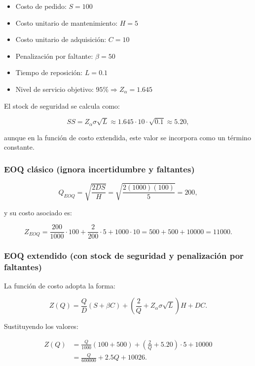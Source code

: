 \documentclass[
  spanish,
  us-letterpaper,
]{scrreprt}
\providecommand{\tightlist}{%
  \setlength{\itemsep}{0pt}\setlength{\parskip}{0pt}}
\numberwithin{equation}{section}
\begin{document}
\begin{itemize}
\tightlist
\item
  Costo de pedido: \(S=100\)\\
\item
  Costo unitario de mantenimiento: \(H=5\)\\
\item
  Costo unitario de adquisición: \(C=10\)\\
\item
  Penalización por faltante: \(\beta=50\)\\
\item
  Tiempo de reposición: \(L=0.1\)\\
\item
  Nivel de servicio objetivo: \(95\%\Rightarrow Z_{\alpha}=1.645\)
\end{itemize}

El stock de seguridad se calcula como:

\[
SS=Z_{\alpha}\sigma\sqrt{L}\approx1.645\cdot10\cdot\sqrt{0.1}\approx5.20,
\]

aunque en la función de costo extendida, este valor se incorpora como un
término constante.

\subsubsection{EOQ clásico (ignora incertidumbre y
faltantes)}\label{eoq-cluxe1sico-ignora-incertidumbre-y-faltantes}

\[
Q_{EOQ}=\sqrt{\frac{2DS}{H}}=\sqrt{\frac{2(1000)(100)}{5}}=200,
\]

y su costo asociado es:

\[
Z_{EOQ}=\frac{200}{1000}\cdot100+\frac{2}{200}\cdot5+1000\cdot10
=500+500+10000=11000.
\]

\subsubsection{EOQ extendido (con stock de seguridad y penalización por
faltantes)}\label{eoq-extendido-con-stock-de-seguridad-y-penalizaciuxf3n-por-faltantes}

La función de costo adopta la forma:

\[
Z(Q)=\frac{Q}{D}(S+\beta C)+\left(\frac{2}{Q}+Z_{\alpha}\sigma\sqrt{L}\right)H+DC.
\]

Sustituyendo los valores:

\begin{align*}
Z(Q) &= \frac{Q}{1000}(100+500) + \left(\frac{2}{Q} + 5.20\right)\cdot 5 + 10000 \\
     &= \frac{Q}{600000} + 2.5Q + 10026.
\end{align*}
\end{document}
